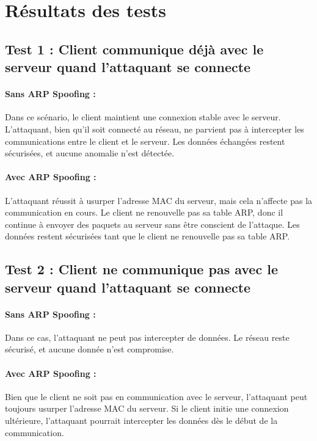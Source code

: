 \documentclass[a4paper,twocolumn]{report}
\begin{document}
\section{Résultats des tests}

\subsection{Test 1 : Client communique déjà avec le serveur quand l'attaquant se connecte}
\paragraph{Sans ARP Spoofing :}

Dans ce scénario, le client maintient une connexion stable avec le serveur.
L'attaquant, bien qu'il soit connecté au réseau, ne parvient pas à intercepter
les communications entre le client et le serveur. Les données échangées restent sécurisées,
et aucune anomalie n'est détectée.

\paragraph{Avec ARP Spoofing :}
L'attaquant réussit à usurper l'adresse MAC du serveur,
mais cela n'affecte pas la communication en cours.
Le client ne renouvelle pas sa table ARP, donc il continue à envoyer des paquets
au serveur sans être conscient de l'attaque. Les données restent sécurisées tant
que le client ne renouvelle pas sa table ARP.

\subsection{Test 2 : Client ne communique pas avec le serveur quand l'attaquant se connecte}
\paragraph{Sans ARP Spoofing :}

Dans ce cas, l'attaquant ne peut pas intercepter de données. Le réseau reste sécurisé,
et aucune donnée n'est compromise.

\paragraph{Avec ARP Spoofing :}

Bien que le client ne soit pas en communication avec le serveur, l'attaquant peut
toujours usurper l'adresse MAC du serveur. Si le client initie une connexion ultérieure,
l'attaquant pourrait intercepter les données dès le début de la communication.
\end{document}

